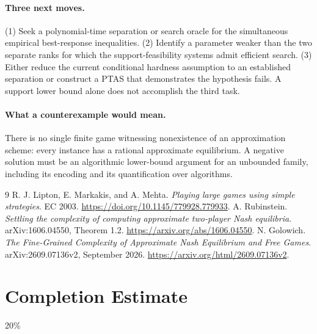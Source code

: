 \documentclass[11pt,a4paper]{article}
\theoremstyle{definition}
\theoremstyle{remark}
\begin{document}
\paragraph{Three next moves.}
(1) Seek a polynomial-time separation or search oracle for the simultaneous empirical best-response inequalities. (2) Identify a parameter weaker than the two separate ranks for which the support-feasibility systems admit efficient search. (3) Either reduce the current conditional hardness assumption to an established separation or construct a PTAS that demonstrates the hypothesis fails. A support lower bound alone does not accomplish the third task.

\paragraph{What a counterexample would mean.}
There is no single finite game witnessing nonexistence of an approximation scheme: every instance has a rational approximate equilibrium. A negative solution must be an algorithmic lower-bound argument for an unbounded family, including its encoding and its quantification over algorithms.

\begin{thebibliography}{9}
 R. J. Lipton, E. Markakis, and A. Mehta. \emph{Playing large games using simple strategies}. EC 2003. \url{https://doi.org/10.1145/779928.779933}.
 A. Rubinstein. \emph{Settling the complexity of computing approximate two-player Nash equilibria}. arXiv:1606.04550, Theorem 1.2. \url{https://arxiv.org/abs/1606.04550}.
 N. Golowich. \emph{The Fine-Grained Complexity of Approximate Nash Equilibrium and Free Games}. arXiv:2609.07136v2, September 2026. \url{https://arxiv.org/html/2609.07136v2}.
\end{thebibliography}

\section{Completion Estimate}
20\%
\end{document}
